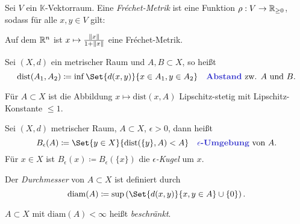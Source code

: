 \documentclass{cheat-sheet}
\newcommand{\K}{\mathbb{K}}
\newcommand{\dist}{\mathrm{dist}} %
\newcommand{\diam}{\mathrm{diam}} %
\begin{document}

\begin{defn}
  Sei $V$ ein $\K$-Vektorraum. Eine \emph{Fréchet-Metrik} ist eine Funktion $\rho : V \to \mathbb{R}_{\geq 0}$, sodass für alle $x, y \in V$ gilt:
  \begin{itemize}
  \end{itemize}
\end{defn}

\begin{bsp}
  Auf dem $\mathbb{R}^n$ ist $x \mapsto \tfrac{\lVert x\rVert}{1 + \lVert x\rVert}$ eine Fréchet-Metrik.
\end{bsp}

\begin{defn}
  Sei $(X, d)$ ein metrischer Raum und $A, B \subset X$, so heißt
  \[ \dist(A_1, A_2) \coloneqq \inf \Set{ d(x,y) }{ x \in A_1, y \in A_2 } \quad \text{\emph{Abstand} zw. $A$ und $B$.} \]
\end{defn}


\begin{bem}
  Für $A \subset X$ ist die Abbildung $x \mapsto \dist(x, A)$ Lipschitz-stetig mit Lipschitz-Konstante $\leq 1$.
\end{bem}

\begin{defn}
  Sei $(X, d)$ metrischer Raum, $A \subset X$, $\epsilon > 0$, dann heißt
  \[ B_\epsilon(A) \coloneqq \Set{ y \in X }{ \dist(\{ y \}, A) < A} \quad \text{\emph{$\epsilon$-Umgebung} von $A$.} \]
  Für $x \in X$ ist $B_\epsilon(x) \coloneqq B_\epsilon(\{ x \})$ die \emph{$\epsilon$-Kugel} um $x$.
\end{defn}

\begin{defn}
  Der \emph{Durchmesser} von $A \subset X$ ist definiert durch
  \[ \diam(A) \coloneqq \sup \left( \Set{ d(x, y) }{ x, y \in A } \cup \{ 0 \} \right). \]
\end{defn}

\begin{defn}
  $A {\subset} X$ mit $\diam(A) < \infty$ heißt \emph{beschränkt}.
\end{defn}
\end{document}

